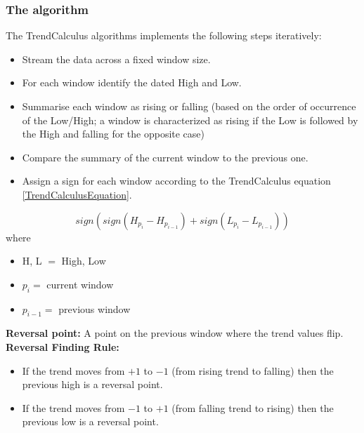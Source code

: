 \documentclass[a4, 11pt]{article}
\begin{document}
\subsubsection{The algorithm}
The TrendCalculus algorithms implements the following steps iteratively:
\begin{itemize}
    \item Stream the data across a fixed window size. 
    \item For each window identify the dated High and Low. 
    \item Summarise each window as rising or falling (based on the order of occurrence of the Low/High; a window is characterized as rising if the Low is followed by the High and falling for the opposite case)
    \item Compare the summary of the current window to the previous one. 
    \item Assign a sign for each window according to the TrendCalculus equation \ref{TrendCalculusEquation}. 
\end{itemize}
\begin{equation}\label{TrendCalculusEquation}
    sign(sign(H_{p_i}-H_{p_{i-1}})+sign(L_{p_i}-L_{p_{i-1}}))
\end{equation} where 
\begin{itemize}
    \item H, L $=$ High, Low 
    \item $p_i=$ current window
    \item $p_{i-1}=$ previous window
\end{itemize}
\textbf{Reversal point:} A point on the previous window where the trend values flip.\\[2ex]
\textbf{Reversal Finding Rule:}
\begin{itemize}
    \item If the trend moves from $+1$ to $-1$ (from rising trend to falling) then the previous high is a reversal point.
    \item If the trend moves from $-1$ to $+1$ (from falling trend to rising) then the previous low is a reversal point. 
\end{itemize}
\end{document}
